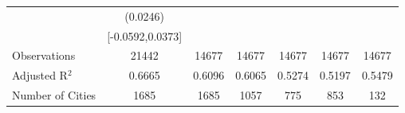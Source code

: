 \documentclass{article}
\begin{document}
\begin{table}[htbp]
\begin{tabular}{l*{6}{c}}
                    &    (0.0246)   &               &               &               &               &               \\
                    &[-0.0592,0.0373]   &               &               &               &               &               \\
\midrule
Observations        &       21442   &       14677   &       14677   &       14677   &       14677   &       14677   \\
Adjusted R$^2$      &      0.6665   &      0.6096   &      0.6065   &      0.5274   &      0.5197   &      0.5479   \\
Number of Cities    &        1685   &        1685   &        1057   &         775   &         853   &         132   \\
\bottomrule
\end{tabular}
\end{table}
\end{document}
